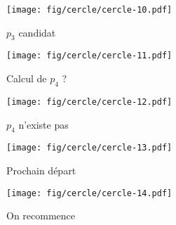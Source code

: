 \documentclass{beamer}
\begin{document}
\begin{frame}
\begin{columns}[t]
\begin{column}{6cm}
{\begin{figure}[h!]
    \end{figure}
    }
    {
      \begin{figure}[h!]
        \centering
        \texttt{[image: fig/cercle/cercle-10.pdf]}
        \caption{$p_{3}$ candidat}
    \end{figure}
    }
    {
      \begin{figure}[h!]
        \centering
        \texttt{[image: fig/cercle/cercle-11.pdf]}
        \caption{Calcul de $p_{4}$ ?}
    \end{figure}
    }
    {
      \begin{figure}[h!]
        \centering
        \texttt{[image: fig/cercle/cercle-12.pdf]}
        \caption{$p_{4}$ n'existe pas}
    \end{figure}
    }
    {
      \begin{figure}[h!]
        \centering
        \texttt{[image: fig/cercle/cercle-13.pdf]}
        \caption{Prochain départ}
    \end{figure}
    }
    {
      \begin{figure}[h!]
        \centering
        \texttt{[image: fig/cercle/cercle-14.pdf]}
        \caption{On recommence}
    \end{figure}
    }

  \end{column}
\end{columns}

\end{frame}
    
\end{document}
